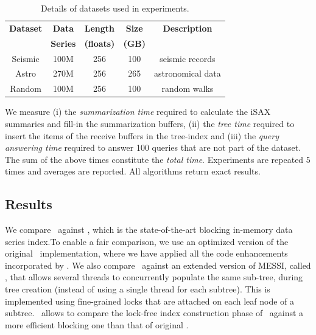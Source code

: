 \begin{table}[htbp]
    \centering
    \renewcommand{\arraystretch}{1.2} %
    \begin{tabular}{||c | c | c | c | c||} 
        \hline
        \textbf{Dataset} & \textbf{Data} & \textbf{Length} & \textbf{Size} & \textbf{Description}  \\ 
        & \textbf{Series} & \textbf{(floats)} & \textbf{(GB)} & \\ [0.5ex]
        \hline\hline
        Seismic & 100M & 256 & 100 & seismic records  \\ 
        \hline
        Astro & 270M & 256 & 265 & astronomical data \\ 
        \hline
        Random & 100M & 256 & 100 & random walks  \\ 
        \hline
    \end{tabular}
    \caption{Details of datasets used in experiments.}
    \label{table:datasets}
\end{table}
\clearpage
{}
% 
We measure (i) the {\em summarization time} required to calculate
the iSAX summaries and fill-in the summarization buffers, 
(ii) the {\em tree time} required to insert the items of the receive buffers in the
tree-index and (iii) the {\em query answering time} required to answer 100 queries
that are not part of the dataset. 
The  sum of the above times constitute the {\em total time}.
Experiments are repeated $5$ times and averages are reported.
All algorithms return exact results.

\subsection{Results}

We compare \Fresh\ against \MESSI, which is the state-of-the-art blocking
in-memory data series index.To enable a fair comparison, we use an 
optimized version of the original \MESSI\ implementation,
where we have applied all the code enhancements incorporated by \Fresh.
% 
We also compare \Fresh\ against an extended version of MESSI, called \MESSIenh
, that allows several threads to concurrently populate the same sub-tree, during tree creation
(instead of using a single thread for each subtree).
This is implemented using fine-grained locks that are attached on each leaf node of a subtree.
\MESSIenh\ allows to compare the lock-free index construction phase of \Fresh\ against a more
efficient blocking one than that of original \MESSI.

